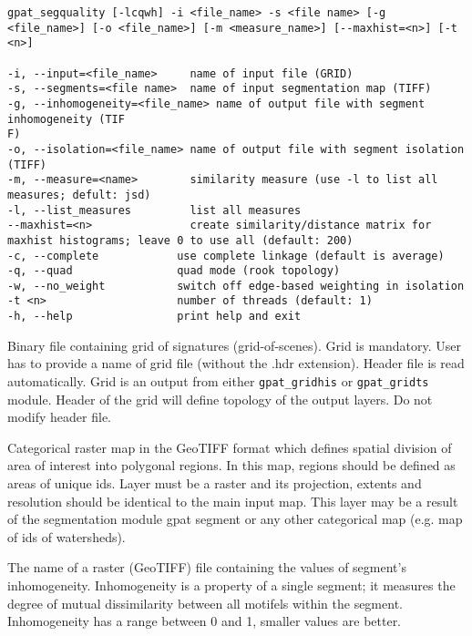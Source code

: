 \begin{minipage}{\linewidth}
\begin{lstlisting}
gpat_segquality [-lcqwh] -i <file_name> -s <file name> [-g <file_name>] [-o <file_name>] [-m <measure_name>] [--maxhist=<n>] [-t <n>]

-i, --input=<file_name>     name of input file (GRID)
-s, --segments=<file name>  name of input segmentation map (TIFF)
-g, --inhomogeneity=<file_name> name of output file with segment inhomogeneity (TIF
F)
-o, --isolation=<file_name> name of output file with segment isolation (TIFF)
-m, --measure=<name>        similarity measure (use -l to list all measures; defult: jsd)
-l, --list_measures         list all measures
--maxhist=<n>               create similarity/distance matrix for maxhist histograms; leave 0 to use all (default: 200)
-c, --complete            use complete linkage (default is average)
-q, --quad                quad mode (rook topology)
-w, --no_weight           switch off edge-based weighting in isolation
-t <n>                    number of threads (default: 1)
-h, --help                print help and exit
\end{lstlisting}
\end{minipage}


Binary file containing grid of signatures (grid-of-scenes). 
Grid is mandatory. 
User has to provide a name of grid file (without the .hdr extension). 
Header file is read automatically. 
Grid is an output from either {\tt gpat\_gridhis} or {\tt gpat\_gridts} module. 
Header of the grid will define topology of the output layers. 
Do not modify header file.


Categorical raster map in the GeoTIFF format which defines spatial division of area of interest into polygonal regions.
In this map, regions should be defined as areas of unique ids.
Layer must be a raster and its projection, extents and resolution should be identical to the main input map. 
This layer may be a result of the segmentation module gpat segment or any other categorical map (e.g. map of ids of watersheds).


The name of a raster (GeoTIFF) file containing the values of segment's inhomogeneity. 
Inhomogeneity is a property of a single segment; it measures the degree of mutual dissimilarity between all motifels within the segment.
Inhomogeneity has a range between 0 and 1, smaller values are better.

